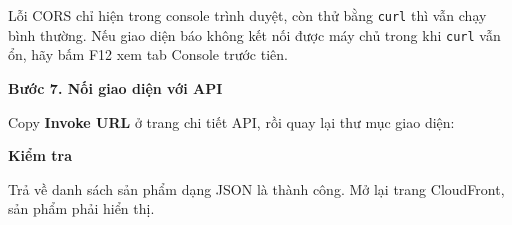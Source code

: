 Lỗi CORS chỉ hiện trong console trình duyệt, còn thử bằng \texttt{curl}
thì vẫn chạy bình thường. Nếu giao diện báo không kết nối được máy chủ
trong khi \texttt{curl} vẫn ổn, hãy bấm F12 xem tab Console trước tiên.

\vspace{0.5em}\noindent\textbf{Bước 7. Nối giao diện với
API}\par

Copy \textbf{Invoke URL} ở trang chi tiết API, rồi quay lại thư mục giao
diện:

\begin{Shaded}
\begin{Highlighting}[]
  \OperatorTok{\textgreater{}}
\OperatorTok{\textless{}}\OperatorTok{\textgreater{}}\NormalTok{/ }
 \OperatorTok{\textless{}}\OperatorTok{\textgreater{}}
\end{Highlighting}
\end{Shaded}

\vspace{0.5em}\noindent\textbf{Kiểm tra}\par

\begin{Shaded}
\begin{Highlighting}[]
\end{Highlighting}
\end{Shaded}

Trả về danh sách sản phẩm dạng JSON là thành công. Mở lại trang
CloudFront, sản phẩm phải hiển thị.
